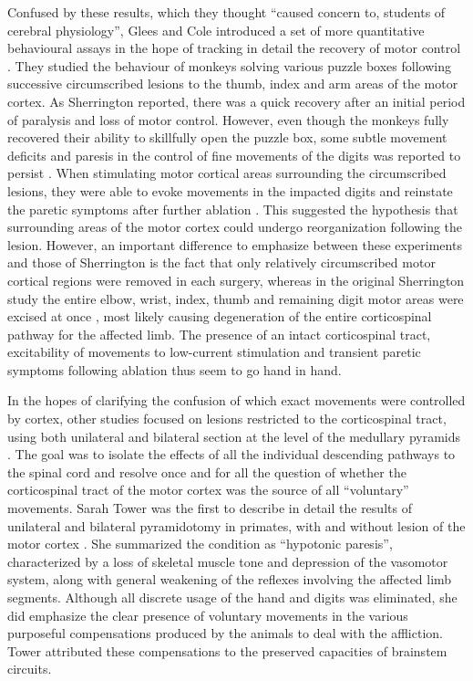 Confused by these results, which they thought ``caused concern to, students of cerebral physiology'', Glees and Cole introduced a set of more quantitative behavioural assays in the hope of tracking in detail the recovery of motor control \cite{Glees1950,Cole1952}. They studied the behaviour of monkeys solving various puzzle boxes following successive circumscribed lesions to the thumb, index and arm areas of the motor cortex. As Sherrington reported, there was a quick recovery after an initial period of paralysis and loss of motor control. However, even though the monkeys fully recovered their ability to skillfully open the puzzle box, some subtle movement deficits and paresis in the control of fine movements of the digits was reported to persist \cite{Glees1950}. When stimulating motor cortical areas surrounding the circumscribed lesions, they were able to evoke movements in the impacted digits and reinstate the paretic symptoms after further ablation \cite{Glees1950}. This suggested the hypothesis that surrounding areas of the motor cortex could undergo reorganization following the lesion. However, an important difference to emphasize between these experiments and those of Sherrington is the fact that only relatively circumscribed motor cortical regions were removed in each surgery, whereas in the original Sherrington study the entire elbow, wrist, index, thumb and remaining digit motor areas were excised at once \cite{Leyton1917}, most likely causing degeneration of the entire corticospinal pathway for the affected limb. The presence of an intact corticospinal tract, excitability of movements to low-current stimulation and transient paretic symptoms following ablation thus seem to go hand in hand.

In the hopes of clarifying the confusion of which exact movements were controlled by cortex, other studies focused on lesions restricted to the corticospinal tract, using both unilateral and bilateral section at the level of the medullary pyramids \cite{Tower1940,Lawrence1968,Lawrence1968a}. The goal was to isolate the effects of all the individual descending pathways to the spinal cord and resolve once and for all the question of whether the corticospinal tract of the motor cortex was the source of all ``voluntary'' movements. Sarah Tower was the first to describe in detail the results of unilateral and bilateral pyramidotomy in primates, with and without lesion of the motor cortex \cite{Tower1940}. She summarized the condition as ``hypotonic paresis'', characterized by a loss of skeletal muscle tone and depression of the vasomotor system, along with general weakening of the reflexes involving the affected limb segments. Although all discrete usage of the hand and digits was eliminated, she did emphasize the clear presence of voluntary movements in the various purposeful compensations produced by the animals to deal with the affliction. Tower attributed these compensations to the preserved capacities of brainstem circuits.

